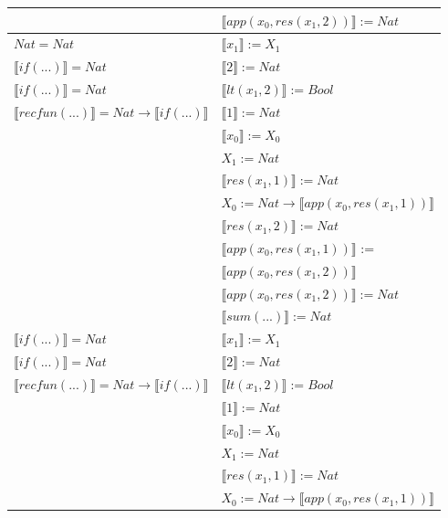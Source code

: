 \begin{exercise}
\begin{description}
\begin{center}
\begin{longtable}[!h]{ | l | l | }
			     & $ \llbracket app(x_0, res(x_1,2)) \rrbracket := Nat$ \\
                    \hline 
                        $Nat = Nat$ &  $ \llbracket x_1 \rrbracket := X_1$\\
                        $ \llbracket if(...) \rrbracket = Nat$ & $ \llbracket 2 \rrbracket := Nat$\\
                        $ \llbracket if(...) \rrbracket =  Nat$ & $ \llbracket lt(x_1 , 2) \rrbracket := Bool$\\
                        $ \llbracket recfun(...) \rrbracket =   Nat  \to  \llbracket if(...) \rrbracket $ & $ \llbracket 1 \rrbracket := Nat$\\
                        & $ \llbracket x_0 \rrbracket := X_0$\\ 
                        &  $X_1 := Nat$\\  
			     & $ \llbracket res(x_1,1) \rrbracket := Nat$\\
			     & $X_0 := Nat \to  \llbracket app(x_0, res(x_1,1)) \rrbracket$ \\
			     & $ \llbracket res(x_1,2) \rrbracket := Nat$ \\
			     & $ \llbracket app(x_0, res(x_1,1)) \rrbracket$ := \\
			     & $ \llbracket app(x_0, res(x_1,2)) \rrbracket$\\ 
			     & $ \llbracket app(x_0, res(x_1,2)) \rrbracket := Nat$ \\
			     & $ \llbracket sum(...) \rrbracket := Nat$ \\
                    \hline 
                        $ \llbracket if(...) \rrbracket = Nat$ & $ \llbracket x_1 \rrbracket := X_1$\\
                        $ \llbracket if(...) \rrbracket = Nat$ & $ \llbracket 2 \rrbracket := Nat$\\
                        $ \llbracket recfun(...) \rrbracket =   Nat  \to  \llbracket if(...) \rrbracket $ & $ \llbracket lt(x_1 , 2) \rrbracket := Bool$\\
                        & $ \llbracket 1 \rrbracket := Nat$\\ 
                        & $ \llbracket x_0 \rrbracket := X_0$\\  
			     & $X_1 := Nat$\\
			     & $ \llbracket res(x_1,1) \rrbracket := Nat$ \\
			     & $X_0 := Nat \to  \llbracket app(x_0, res(x_1,1)) \rrbracket$ \\

\end{longtable}
\end{center}
\end{description}
\end{exercise}
